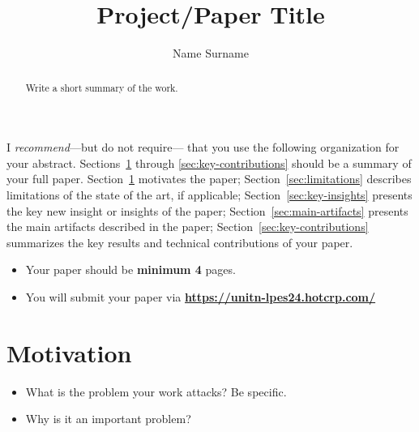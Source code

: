 \documentclass[sigconf,10pt,nonacm]{acmart}
\begin{document}
\title[Project/Paper Title]{Project/Paper Title}

\author{Name Surname}



\renewcommand{\shortauthors}{XXX et al.}


\begin{abstract}
Write a short summary of the work. 
\end{abstract}

\maketitle

I \emph{recommend}---but do not require--- that you use
the following organization for your abstract. 
Sections~\ref{sec:motivation} through \ref{sec:key-contributions}
should be a summary of your full paper. Section~\ref{sec:motivation}
motivates the paper; Section~\ref{sec:limitations} describes
limitations of the state of the art, if applicable;
Section~\ref{sec:key-insights} presents the key new insight or
insights of the paper; 
Section~\ref{sec:main-artifacts} presents the main artifacts described
in the paper;  Section~\ref{sec:key-contributions} summarizes the key
results and technical contributions of your paper. 

\begin{itemize}
    \item Your paper should be {\bf minimum 4} pages.

    \item You will submit your paper via {\bf \href{https://unitn-lpes24.hotcrp.com/}{https://unitn-lpes24.hotcrp.com/}}
\end{itemize}


\section{Motivation}
\label{sec:motivation}


\begin{itemize}
\item What is the problem your work attacks? Be specific.
\item Why is it an important problem?
\end{itemize}
\end{document}
